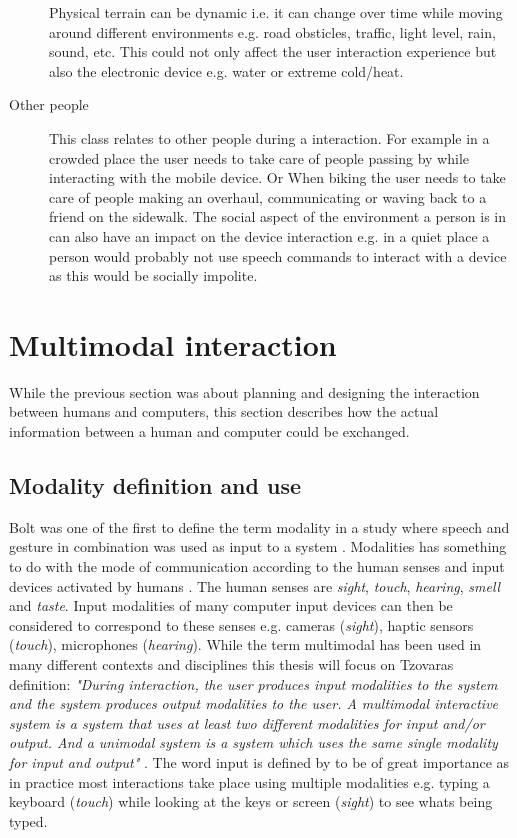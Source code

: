 \begin{description}
Physical terrain can be dynamic i.e. it can change over time while moving around different environments e.g. road obsticles, traffic, light level, rain, sound, etc. This could not only affect the user interaction experience but also the electronic device e.g. water or extreme cold/heat.

\item[Other people]
This class relates to other people during a interaction. For example in a crowded place the user needs to take care of people passing by while interacting with the mobile device. Or When biking the user needs to take care of people making an overhaul, communicating or waving back to a friend on the sidewalk. The social aspect of the environment a person is in can also have an impact on the device interaction e.g. in a quiet place a person would probably not use speech commands to interact with a device as this would be socially impolite.
\end{description}


\section{Multimodal interaction}
While the previous section was about planning and designing the interaction between humans and computers, this section describes how the actual information between a human and computer could be exchanged. 

\subsection{Modality definition and use}
Bolt was one of the first to define the term modality in a study where speech and gesture in combination was used as input to a system \cite{bolt_put-that-there:_1980}. Modalities has something to do with the mode of communication according to the human senses and input devices activated by humans \cite{jaimes_multimodal_2007,tzovaras_dimitrios_multimodal_2008}. The human senses are \textit{sight}, \textit{touch}, \textit{hearing}, \textit{smell} and \textit{taste}. Input modalities of many computer input devices can then be considered to correspond to these senses e.g. cameras (\textit{sight}), haptic sensors (\textit{touch}), microphones (\textit{hearing}). While the term multimodal has been used in many different contexts and disciplines this thesis will focus on Tzovaras definition: \textit{"During interaction, the user produces input modalities to the system and the system produces output modalities to the user. A multimodal interactive system is a system that uses at least two different modalities for input and/or output. And a unimodal system is a system which uses the same single modality for input and output"} \cite{tzovaras_dimitrios_multimodal_2008}. The word input is defined by \cite{jaimes_multimodal_2007} to be of great importance as in practice most interactions take place using multiple modalities e.g. typing a keyboard (\textit{touch}) while looking at the keys or screen (\textit{sight}) to see whats being typed.

